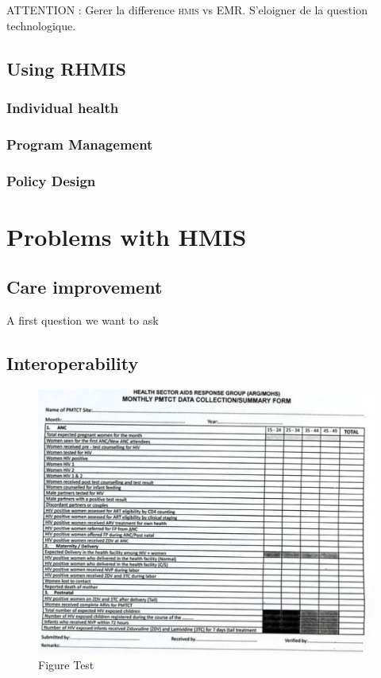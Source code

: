 \documentclass[a4paper,11pt,final,twoside]{article}
\begin{document}
ATTENTION : Gerer la difference \textsc{hmis} vs EMR. S'eloigner de la question technologique. 

	\subsection{Using RHMIS}

		\subsubsection{Individual health}

		\subsubsection{Program Management}
		
		\subsubsection{Policy Design}

\section{Problems with HMIS}

	\subsection{Care improvement}

A first question we want to ask 

	\subsection{Interoperability}


\begin{figure}[ht]
\begin{center}
\includegraphics[scale=0.5]{figure/Picture1.png} 
\caption{Figure Test}
\end{center}
\end{figure}
\end{document}
